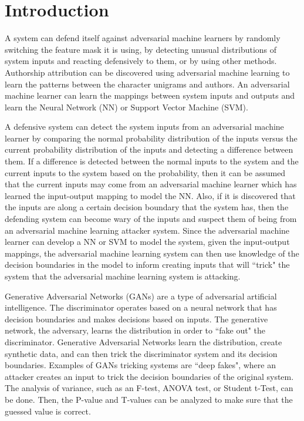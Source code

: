 \documentclass[conference]{IEEEtran}
\begin{document}
\section{Introduction}

A system can defend itself against adversarial machine learners by randomly switching the feature mask it is using, by detecting unusual distributions of system inputs and reacting defensively to them, or by using other methods. Authorship attribution can be discovered using adversarial machine learning to learn the patterns between the character unigrams and authors. An adversarial machine learner can learn the mappings between system inputs and outputs and learn the Neural Network (NN) or Support Vector Machine (SVM). 

A defensive system can detect the system inputs from an adversarial machine learner by comparing the normal probability distribution of the inputs versus the current probability distribution
 of 
the inputs and detecting a difference between them. If a difference is detected between the normal inputs to the system and the current inputs to the system based on the probability, then it can be assumed that the current inputs may come from an adversarial machine learner which 
has learned 
the input-output mapping to model the NN. 
Also, if it is discovered that the inputs are along a certain decision boundary that the system has, then the defending system can become wary of the inputs and suspect them of being from an adversarial machine learning attacker system. 
Since the adversarial machine learner can develop a NN or SVM to model the system, given the input-output mappings, the adversarial machine learning system can then use knowledge of the decision boundaries in the model to inform creating inputs that will ``trick" the system that the adversarial machine learning system is attacking. 

Generative Adversarial Networks (GANs) are a type of adversarial artificial intelligence. The discriminator operates based on a neural network that has decision boundaries and makes decisions based on inputs. The generative network, the adversary, learns the distribution in order to ``fake out" the discriminator. Generative Adversarial Networks learn the distribution, create synthetic data, and can then trick the discriminator system and its decision boundaries. Examples of GANs tricking systems are ``deep fakes", where an attacker creates an input to trick the decision boundaries of the original system. The analysis of variance, such as an F-test, ANOVA test, or Student t-Test, can be done. Then, the P-value and T-values can be analyzed to make sure that the guessed value is correct. 
\end{document}
